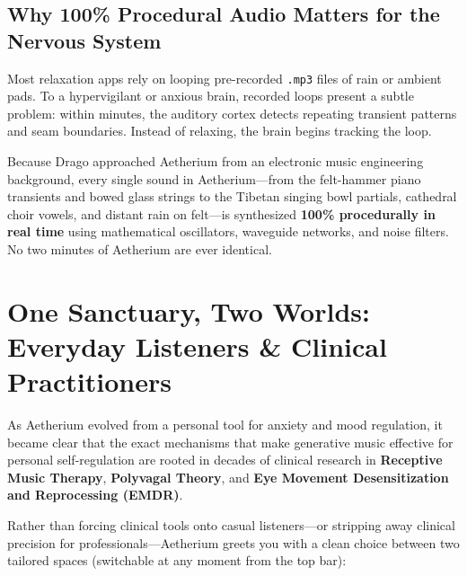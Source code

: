 \documentclass[11pt,oneside,openany]{book}
\begin{document}
\section{Why 100\% Procedural Audio Matters for the Nervous System}

Most relaxation apps rely on looping pre-recorded \texttt{.mp3} files of rain or ambient pads. To a hypervigilant or anxious brain, recorded loops present a subtle problem: within minutes, the auditory cortex detects repeating transient patterns and seam boundaries. Instead of relaxing, the brain begins tracking the loop.

Because Drago approached Aetherium from an electronic music engineering background, every single sound in Aetherium---from the felt-hammer piano transients and bowed glass strings to the Tibetan singing bowl partials, cathedral choir vowels, and distant rain on felt---is synthesized \textbf{100\% procedurally in real time} using mathematical oscillators, waveguide networks, and noise filters. No two minutes of Aetherium are ever identical.

\chapter[One Sanctuary, Two Worlds]{One Sanctuary, Two Worlds: Everyday Listeners \& Clinical Practitioners}

As Aetherium evolved from a personal tool for anxiety and mood regulation, it became clear that the exact mechanisms that make generative music effective for personal self-regulation are rooted in decades of clinical research in \textbf{Receptive Music Therapy}, \textbf{Polyvagal Theory}, and \textbf{Eye Movement Desensitization and Reprocessing (EMDR)}.

Rather than forcing clinical tools onto casual listeners---or stripping away clinical precision for professionals---Aetherium greets you with a clean choice between two tailored spaces (switchable at any moment from the top bar):
\end{document}

